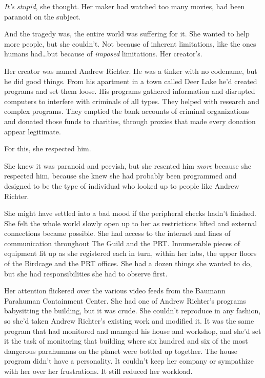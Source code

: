 \emph{It's stupid}, she thought.  Her maker had watched too many movies, had been paranoid on the subject.



And the tragedy was, the entire world was suffering for it.  She wanted to help more people, but she couldn't.  Not because of inherent limitations, like the ones humans had\ldots but because of \emph{imposed }limitations.  Her creator's.



Her creator was named Andrew Richter.  He was a tinker with no codename, but he did good things.  From his apartment in a town called Deer Lake he'd created programs and set them loose.  His programs gathered information and disrupted computers to interfere with criminals of all types.  They helped with research and complex programs.  They emptied the bank accounts of criminal organizations and donated those funds to charities, through proxies that made every donation appear legitimate.



For this, she respected him.



She knew it was paranoid and peevish, but she resented him \emph{more} because she respected him, because she knew she had probably been programmed and designed to be the type of individual who looked up to people like Andrew Richter.



She might have settled into a bad mood if the peripheral checks hadn't finished.  She felt the whole world slowly open up to her as restrictions lifted and external connections became possible.  She had access to the internet and lines of communication throughout The Guild and the PRT.  Innumerable pieces of equipment lit up as she registered each in turn, within her labs, the upper floors of the Birdcage and the PRT offices.  She had a dozen things she wanted to do, but she had responsibilities she had to observe first.



Her attention flickered over the various video feeds from the Baumann Parahuman Containment Center.  She had one of Andrew Richter's programs babysitting the building, but it was crude.  She couldn't reproduce in any fashion, so she'd taken Andrew Richter's existing work and modified it. It was the same program that had monitored and managed his house and workshop, and she'd set it the task of monitoring that building where six hundred and six of the most dangerous parahumans on the planet were bottled up together.  The house program didn't have a personality.  It couldn't keep her company or sympathize with her over her frustrations.  It still reduced her workload.



